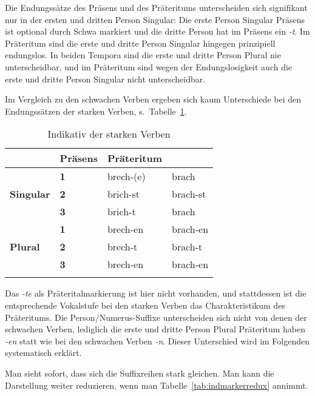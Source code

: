 Die Endungssätze des Präsens und des Präteritums unterscheiden sich signifikant nur in der ersten und dritten Person Singular:
Die erste Person Singular Präsens ist optional durch Schwa markiert und die dritte Person hat im Präsens ein \textit{-t}.
Im Präteritum sind die erste und dritte Person Singular hingegen prinzipiell endungslos.
In beiden Tempora sind die erste und dritte Person Plural nie unterscheidbar, und im Präteritum sind wegen der Endungslosigkeit auch die erste und dritte Person Singular nicht unterscheidbar.

Im Vergleich zu den schwachen Verben ergeben sich kaum Unterschiede bei den Endungssätzen der starken Verben, s.\ Tabelle~\ref{tab:stvind}.

\begin{table}
  \centering
  \begin{tabular}{llll}
    \lsptoprule
    \multicolumn{2}{c}{} & \textbf{Präsens} & \textbf{Präteritum} \\
    \midrule
    \multirow{3}{*}{\textbf{Singular}} & \textbf{1} & brech-(e) & brach \\
    & \textbf{2} & brich-st & brach-st \\
    & \textbf{3} & brich-t & brach \\
    \midrule
    \multirow{3}{*}{\textbf{Plural}} & \textbf{1} & brech-en & brach-en \\
    & \textbf{2} & brech-t & brach-t \\
    & \textbf{3} & brech-en & brach-en \\
    \lspbottomrule
  \end{tabular}
  \caption{Indikativ der starken Verben}
  \label{tab:stvind}
\end{table}


Das \textit{-te} als Präteritalmarkierung ist hier nicht vorhanden, und stattdessen ist die entsprechende Vokalstufe bei den starken Verben das Charakteristikum des Präteritums.
Die Person\slash Numerus-Suffixe unterscheiden sich nicht von denen der schwachen Verben, lediglich die erste und dritte Person Plural Präteritum haben \textit{-en} statt wie bei den schwachen Verben \textit{-n}.
Dieser Unterschied wird im Folgenden systematisch erklärt.

Man sieht sofort, dass sich die Suffixreihen stark gleichen.
Man kann die Darstellung weiter reduzieren, wenn man Tabelle~\ref{tab:indmarkerredux} annimmt.

